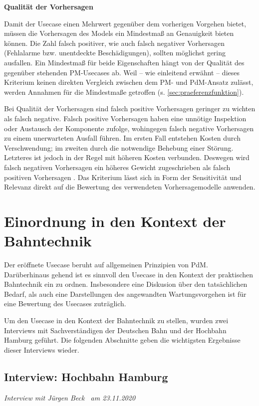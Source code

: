 \textbf{Qualität der Vorhersagen}

Damit der Usecase einen Mehrwert gegenüber dem vorherigen Vorgehen bietet, müssen die Vorhersagen des Models ein Mindestmaß an Genauigkeit bieten können. Die Zahl falsch positiver, wie auch falsch negativer Vorhersagen (Fehlalarme bzw. unentdeckte Beschädigungen), sollten möglichst gering ausfallen. Ein Mindestmaß für beide Eigenschaften hängt von der Qualität des gegenüber stehenden PM-Usecases ab. Weil -- wie einleitend erwähnt -- dieses Kriterium keinen direkten Vergleich zwischen dem PM- und PdM-Ansatz zulässt, werden Annahmen für die Mindestmaße getroffen (s. \cref{sec:praeferenzfunktion}).

Bei Qualität der Vorhersagen sind falsch positive Vorhersagen geringer zu wichten als falsch negative. Falsch positive Vorhersagen haben eine unnötige Inspektion oder Austausch der Komponente zufolge, wohingegen falsch negative Vorhersagen zu einem unerwarteten Ausfall führen. Im ersten Fall entstehen Kosten durch Verschwendung; im zweiten durch die notwendige Behebung einer Störung. Letzteres ist jedoch in der Regel mit höheren Kosten verbunden. Deswegen wird falsch negativen Vorhersagen ein höheres Gewicht zugeschrieben als falsch positiven Vorhersagen . 
Das Kriterium lässt sich in Form der Sensitivität und Relevanz direkt auf die Bewertung des verwendeten Vorhersagemodelle anwenden.
\section{Einordnung in den Kontext der Bahntechnik}
\label{sec:kontext_bahntechnik_von_usecase}
Der eröffnete Usecase beruht auf allgemeinen Prinzipien von PdM. Darüberhinaus gehend ist es sinnvoll den Usecase in den Kontext der praktischen Bahntechnik ein zu ordnen. Insbesondere eine Diskusion über den tatsächlichen Bedarf, als auch eine Darstellungen des angewandten Wartungsvorgehen ist für eine Bewertung des Usecases zuträglich.

Um den Usecase in den Kontext der Bahntechnik zu stellen, wurden zwei Interviews mit Sachverständigen der Deutschen Bahn und der Hochbahn Hamburg geführt. Die folgenden Abschnitte geben die wichtigsten Ergebnisse dieser Interviews wieder.
\subsection{Interview: Hochbahn Hamburg}
\label{subsec:interview_hochbahn}
\textit{Interview mit Jürgen Beck~\cite{hochbahn.23.11.2020} am {23.11.2020}}

